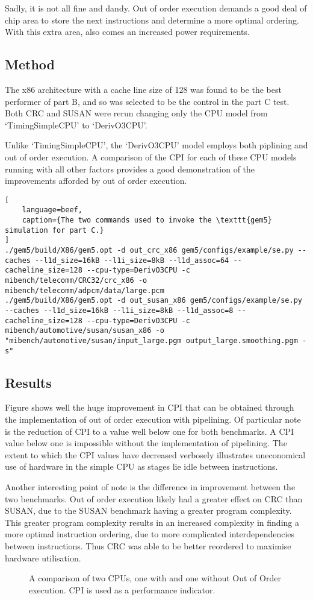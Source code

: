 Sadly, it is not all fine and dandy. Out of order execution demands a good
deal of chip area to store the next instructions and determine a more optimal
ordering. With this extra area, also comes an increased power requirements.

\subsection{Method}

The x86 architecture with a cache line size of 128 was found to be the best
performer of part B, and so was selected to be the control in the part C test.
Both CRC and SUSAN were rerun changing only the CPU model from `TimingSimpleCPU'
to `DerivO3CPU'.

Unlike `TimingSimpleCPU', the `DerivO3CPU' model employs both piplining and out
of order execution. A comparison of the CPI for each of these CPU models running
with all other factors provides a good demonstration of the improvements
afforded by out of order execution.

\begin{lstlisting}[
    language=beef,
    caption={The two commands used to invoke the \texttt{gem5} simulation for part C.}
]
./gem5/build/X86/gem5.opt -d out_crc_x86 gem5/configs/example/se.py --caches --l1d_size=16kB --l1i_size=8kB --l1d_assoc=64 --cacheline_size=128 --cpu-type=DerivO3CPU -c mibench/telecomm/CRC32/crc_x86 -o mibench/telecomm/adpcm/data/large.pcm
./gem5/build/X86/gem5.opt -d out_susan_x86 gem5/configs/example/se.py --caches --l1d_size=16kB --l1i_size=8kB --l1d_assoc=8 --cacheline_size=128 --cpu-type=DerivO3CPU -c mibench/automotive/susan/susan_x86 -o "mibench/automotive/susan/input_large.pgm output_large.smoothing.pgm -s"
\end{lstlisting}


\subsection{Results}
Figure \label{fig:partc-cpi} shows well the huge improvement in CPI that can be
obtained through the implementation of out of order execution with pipelining.
Of particular note is the reduction of CPI to a value well below one for both
benchmarks. A CPI value below one is impossible without the implementation of
pipelining.
The extent to which the CPI values have decreased verbosely illustrates
uneconomical use of hardware in the simple CPU as stages lie idle between
instructions.

Another interesting point of note is the difference in improvement between the
two benchmarks. Out of order execution likely had a greater effect on CRC than
SUSAN, due to the SUSAN benchmark having a greater program complexity. This
greater program complexity results in an increased complexity in finding a more
optimal instruction ordering, due to more complicated interdependencies between
instructions. Thus CRC was able to be better reordered to maximise hardware
utilisation.

\begin{figure}
    \centering
    
    \caption{
        A comparison of two CPUs, one with and one without Out of Order
    execution. CPI is used as a performance indicator.
    }
    \label{fig:partc-cpi}
\end{figure}
